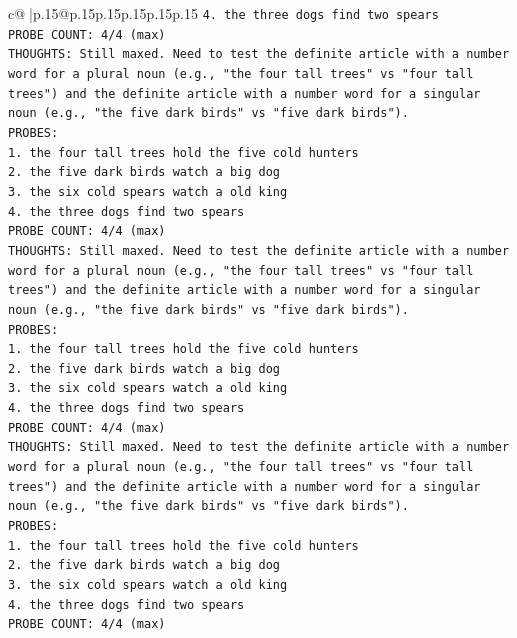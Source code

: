\documentclass{article}
\begin{document}
{\begin{supertabular}{c@{$\;$}|p{.15\linewidth}@{}p{.15\linewidth}p{.15\linewidth}p{.15\linewidth}p{.15\linewidth}p{.15\linewidth}}
{{{\texttt{4. the three dogs find two spears} \\
\texttt{PROBE COUNT: 4/4 (max)} \\
\texttt{THOUGHTS: Still maxed. Need to test the definite article with a number word for a plural noun (e.g., "the four tall trees" vs "four tall trees") and the definite article with a number word for a singular noun (e.g., "the five dark birds" vs "five dark birds").} \\
\texttt{PROBES:} \\
\texttt{1. the four tall trees hold the five cold hunters} \\
\texttt{2. the five dark birds watch a big dog} \\
\texttt{3. the six cold spears watch a old king} \\
\texttt{4. the three dogs find two spears} \\
\texttt{PROBE COUNT: 4/4 (max)} \\
\texttt{THOUGHTS: Still maxed. Need to test the definite article with a number word for a plural noun (e.g., "the four tall trees" vs "four tall trees") and the definite article with a number word for a singular noun (e.g., "the five dark birds" vs "five dark birds").} \\
\texttt{PROBES:} \\
\texttt{1. the four tall trees hold the five cold hunters} \\
\texttt{2. the five dark birds watch a big dog} \\
\texttt{3. the six cold spears watch a old king} \\
\texttt{4. the three dogs find two spears} \\
\texttt{PROBE COUNT: 4/4 (max)} \\
\texttt{THOUGHTS: Still maxed. Need to test the definite article with a number word for a plural noun (e.g., "the four tall trees" vs "four tall trees") and the definite article with a number word for a singular noun (e.g., "the five dark birds" vs "five dark birds").} \\
\texttt{PROBES:} \\
\texttt{1. the four tall trees hold the five cold hunters} \\
\texttt{2. the five dark birds watch a big dog} \\
\texttt{3. the six cold spears watch a old king} \\
\texttt{4. the three dogs find two spears} \\
\texttt{PROBE COUNT: 4/4 (max)} \\
}}}
\end{supertabular}}
\end{document}

